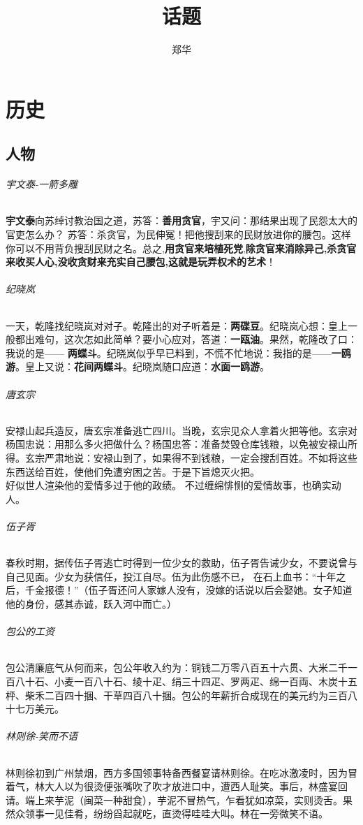 \documentclass[UTF8,a4paper,12pt]{ctexbook}
\author{\kaishu 郑华}
\title{\heiti 话题}
\begin{document}
 	\maketitle
	\tableofcontents
\chapter{历史}
	\section{人物}
		\subparagraph{宇文泰-一箭多雕}\textbf{宇文泰}向苏绰讨教治国之道，苏答：\textbf{善用贪官}，宇又问：那结果出现了民怨太大的官吏怎么办？ 苏答：杀贪官，为民伸冤！把他搜刮来的民财放进你的腰包。这样你可以不用背负搜刮民财之名。总之,\textbf{用贪官来培植死党},\textbf{除贪官来消除异己,杀贪官来收买人心,没收贪财来充实自己腰包,这就是玩弄权术的艺术}！

		\subparagraph{纪晓岚}一天，乾隆找纪晓岚对对子。乾隆出的对子听着是：\textbf{两碟豆}。纪晓岚心想：皇上一般都出难句，这次怎如此简单？要小心应对，答道：\textbf{一瓯油}。果然，乾隆改了口：我说的是—— \textbf{两蝶斗}。纪晓岚似乎早已料到，不慌不忙地说：我指的是——\textbf{一鸥游}。皇上又说：\textbf{花间两蝶斗}。纪晓岚随口应道：\textbf{水面一鸥游}。
		
		\subparagraph{唐玄宗}安禄山起兵造反，唐玄宗准备逃亡四川。当晚，玄宗见众人拿着火把等他。玄宗对杨国忠说：用那么多火把做什么？杨国忠答：准备焚毁仓库钱粮，以免被安禄山所得。玄宗严肃地说：安禄山到了，如果得不到钱粮，一定会搜刮百姓。不如将这些东西送给百姓，使他们免遭穷困之苦。于是下旨熄灭火把。\\ 好似世人渲染他的爱情多过于他的政绩。 不过缠绵悱恻的爱情故事，也确实动人。
		
		\subparagraph{伍子胥}春秋时期，据传伍子胥逃亡时得到一位少女的救助，伍子胥告诫少女，不要说曾与自己见面。少女为获信任，投江自尽。伍为此伤感不已， 在石上血书：“十年之后，千金报德！”（伍子胥还问人家嫁人没有，没嫁的话说以后会娶她。女子知道他的身份，感其赤诚，跃入河中而亡。）
		
		\subparagraph{包公的工资}包公清廉底气从何而来，包公年收入约为：铜钱二万零八百五十六贯、大米二千一百八十石、小麦一百八十石、绫十疋、绢三十四疋、罗两疋、绵一百両、木炭十五枰、柴禾二百四十捆、干草四百八十捆。包公的年薪折合成现在的美元约为三百八十七万美元。
		
		\subparagraph{林则徐-笑而不语}林则徐初到广州禁烟，西方多国领事特备西餐宴请林则徐。在吃冰激凌时，因为冒着气，林大人以为很烫便张嘴吹了吹才放进口中，遭西人耻笑。事后，林盛宴回请。端上来芋泥（闽菜一种甜食），芋泥不冒热气，乍看犹如凉菜，实则烫舌。果然众领事一见佳肴，纷纷舀起就吃，直烫得哇哇大叫。林在一旁微笑不语。
		
\end{document}
